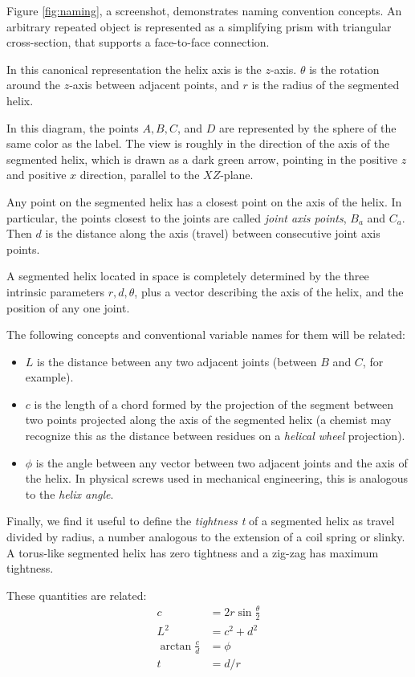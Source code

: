 \documentclass{svproc}
\begin{document}
Figure \ref{fig:naming}, a screenshot, demonstrates naming convention concepts.
An arbitrary repeated object is represented as a simplifying prism
with triangular cross-section,  that supports a face-to-face connection.

In this canonical representation the helix axis is
the $z$-axis.
$\theta$ is the rotation around the $z$-axis
between adjacent points, and
$r$ is the radius of the segmented helix.

In this diagram, the
points $A,B,C$, and $D$ are represented by the sphere of the same color as the label. The view is roughly in the direction of
the axis of the segmented helix, which is drawn as a dark green arrow, pointing in the positive $z$ and positive $x$ direction,
parallel to the $XZ$-plane.

Any point on the segmented helix has a closest point on the axis of the helix.
In particular, the points closest to the
joints are called {\em joint axis points}, $B_a$ and $C_a$.
Then $d$ is the distance along the axis (travel) between consecutive joint axis points.

A segmented helix located in space is completely determined by
the three intrinsic parameters $r,d,\theta$, plus
a vector describing the axis
of the helix, and the position of any one joint.

The following concepts and conventional variable names for them will be related:
\begin{itemize}
\item $L$ is the distance between any two adjacent joints (between $B$ and $C$, for example).
  \item $c$ is the length of a chord formed by the projection of the segment between two points projected along the axis of the segmented helix (a chemist may recognize this as the distance between residues on a {\em helical wheel} projection).
\item $\phi$ is the angle between any vector between two adjacent joints and the axis of the helix. In physical screws used in mechanical engineering, this is analogous to the {\em helix angle}.
  \end{itemize}
Finally, we find it useful to define the {\em tightness t} of a segmented helix
as travel divided by radius, a number
analogous to the extension of a coil spring or slinky.
A torus-like segmented helix has zero tightness and a zig-zag has
maximum tightness.

These quantities are related:
\begin{align}
    c &= 2r\sin{\frac{\theta}{2}} \\
    L^2 &= c^2+d^2  \\
    \arctan{\frac{c}{d}}  &= \phi \\
    t &= d / r
\end{align}
\end{document}
